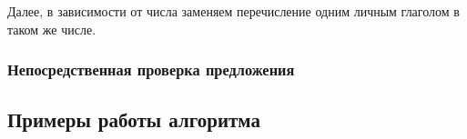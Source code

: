 \documentclass[main]{subfiles}
\begin{document}
Далее, в зависимости от числа заменяем перечисление одним личным глаголом в таком же числе. 
\subsubsection{Непосредственная проверка предложения}
\subsection{Примеры работы алгоритма}
\end{document}

